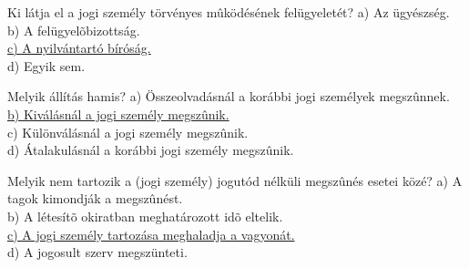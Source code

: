 \begin{frame}

\begin{tcolorbox}[title={52. Kérdés}]
Ki látja el a jogi személy törvényes mûködésének felügyeletét?
\tcblower
a) Az ügyészség.\\
b) A felügyelõbizottság.\\
\uline {c) A nyilvántartó bíróság.}\\
d) Egyik sem.
\end{tcolorbox}

\begin{tcolorbox}[title={53. Kérdés}]
Melyik állítás hamis?
\tcblower
a) Összeolvadásnál a korábbi jogi személyek megszûnnek.\\
\uline {b) Kiválásnál a jogi személy megszûnik.}\\
c) Különválásnál a jogi személy megszûnik.\\
d) Átalakulásnál a korábbi jogi személy megszûnik.
\end{tcolorbox}

\begin{tcolorbox}[title={54. Kérdés}]
Melyik nem tartozik a (jogi személy) jogutód nélküli megszûnés esetei közé?
\tcblower
a) A tagok kimondják a megszûnést.\\
b) A létesítõ okiratban meghatározott idõ eltelik.\\
\uline {c) A jogi személy tartozása meghaladja a vagyonát.}\\
d) A jogosult szerv megszünteti.
\end{tcolorbox}

\end{frame}


